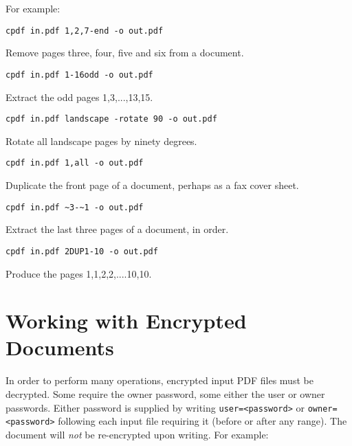 \documentclass{book}
\begin{document}
  \noindent For example:
  \begin{framed}
  \small\verb!cpdf in.pdf 1,2,7-end -o out.pdf!

  \vspace{2.5mm}
  \noindent Remove pages three, four, five and six from a document.

  \vspace{2.5mm}
  \verb!cpdf in.pdf 1-16odd -o out.pdf!

  \vspace{2.5mm}
  \noindent Extract the odd pages 1,3,...,13,15.
  
  \vspace{2.5mm}
  \verb!cpdf in.pdf landscape -rotate 90 -o out.pdf!

  \vspace{2.5mm}
  \noindent Rotate all landscape pages by ninety degrees.
    
  \vspace{2.5mm}
  \verb!cpdf in.pdf 1,all -o out.pdf!

  \vspace{2.5mm}
  \noindent Duplicate the front page of a document, perhaps as a fax cover sheet.

  \vspace{2.5mm}
  \verb!cpdf in.pdf ~3-~1 -o out.pdf!

  \vspace{2.5mm}
  \noindent Extract the last three pages of a document, in order.

  \vspace{2.5mm}
  \verb!cpdf in.pdf 2DUP1-10 -o out.pdf!

  \vspace{2.5mm}
  \noindent Produce the pages 1,1,2,2,....10,10.

  \end{framed}

  \section{Working with Encrypted Documents}
  In order to perform many operations, encrypted input PDF files must be
decrypted. Some require the owner password, some either the user or owner
passwords. Either password is supplied by writing \texttt{user=<password>} or
\texttt{owner=<password>} following each input file requiring it (before or
after any range). The document will \textit{not} be re-encrypted upon writing.  For
example:
\end{document}
